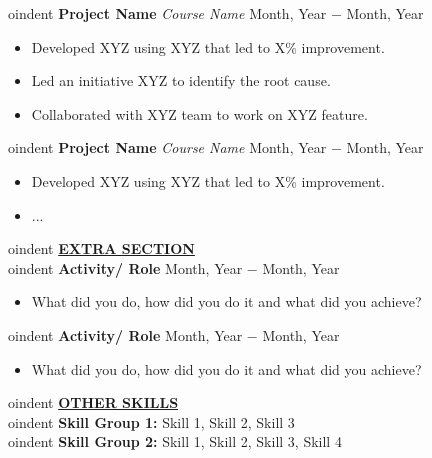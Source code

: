 \documentclass{article}
\begin{document}
oindent \textbf{Project Name} \textit{Course Name} \hfill  Month, Year $-$ Month, Year
\begin{itemize}[noitemsep,nolistsep,leftmargin=*]
\item {Developed XYZ using XYZ that led to X\% improvement.}
\item {Led an initiative XYZ to identify the root cause.}
\item {Collaborated with XYZ team to work on XYZ feature. \\}
\end{itemize}


oindent \textbf{Project Name} \textit{Course Name} \hfill  Month, Year $-$ Month, Year
\begin{itemize}[noitemsep,nolistsep,leftmargin=*]
\item {Developed XYZ using XYZ that led to X\% improvement.}
\item {... \\}
\end{itemize}


oindent \textbf{\underline{EXTRA SECTION}} \\

oindent \textbf{Activity/ Role} \hfill Month, Year $-$ Month, Year
\begin{itemize}[noitemsep,nolistsep,leftmargin=*]
\item {What did you do, how did you do it and what did you achieve? \\}
\end{itemize}


oindent \textbf{Activity/ Role} \hfill Month, Year $-$ Month, Year
\begin{itemize}[noitemsep,nolistsep,leftmargin=*]
\item {What did you do, how did you do it and what did you achieve? \\}
\end{itemize}


oindent \textbf{\underline{OTHER SKILLS}} \\

oindent \textbf{Skill Group 1:} Skill 1, Skill 2, Skill 3 \\

oindent \textbf{Skill Group 2: } Skill 1, Skill 2, Skill 3, Skill 4
\end{document}
